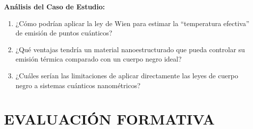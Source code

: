\documentclass[12pt,a4paper]{article}
\begin{document}
	\begin{preguntabox}
		\textbf{Análisis del Caso de Estudio:}
		\begin{enumerate}
			\item ¿Cómo podrían aplicar la ley de Wien para estimar la ``temperatura efectiva'' de emisión de puntos cuánticos?
			
			\vspace{2cm}
			
			\item ¿Qué ventajas tendría un material nanoestructurado que pueda controlar su emisión térmica comparado con un cuerpo negro ideal?
			
			\vspace{2cm}
			
			\item ¿Cuáles serían las limitaciones de aplicar directamente las leyes de cuerpo negro a sistemas cuánticos nanométricos?
			
			\vspace{2cm}
		\end{enumerate}
	\end{preguntabox}
	
	
	\section{EVALUACIÓN FORMATIVA}
	
\end{document}
